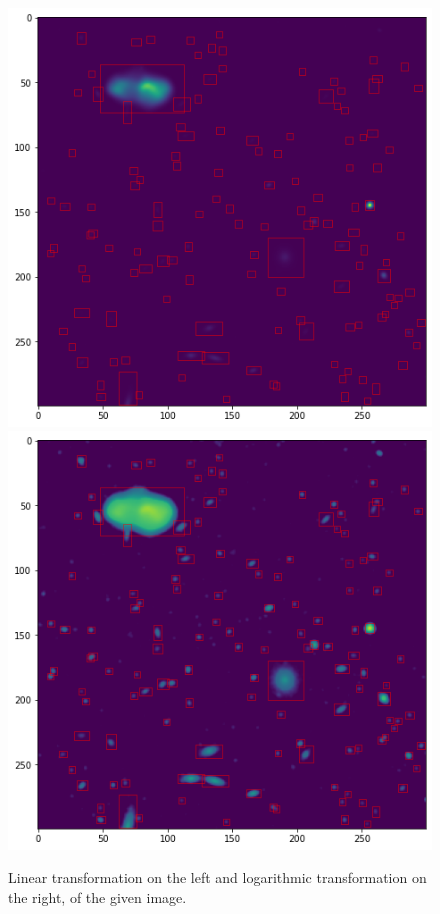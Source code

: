 \documentclass[a4paper,10pt]{report}
\begin{document}
\begin{figure}[!htb]
    \includegraphics[width=\linewidth]{RGB_linear.png}
  \endminipage\hfill
    \includegraphics[width=\linewidth]{RGB_log.png}
  \endminipage\hfill
  \caption{Linear transformation on the left and logarithmic transformation on the right, of the given image.}
  \label{fig:image_transf}
\end{figure}
\end{document}
